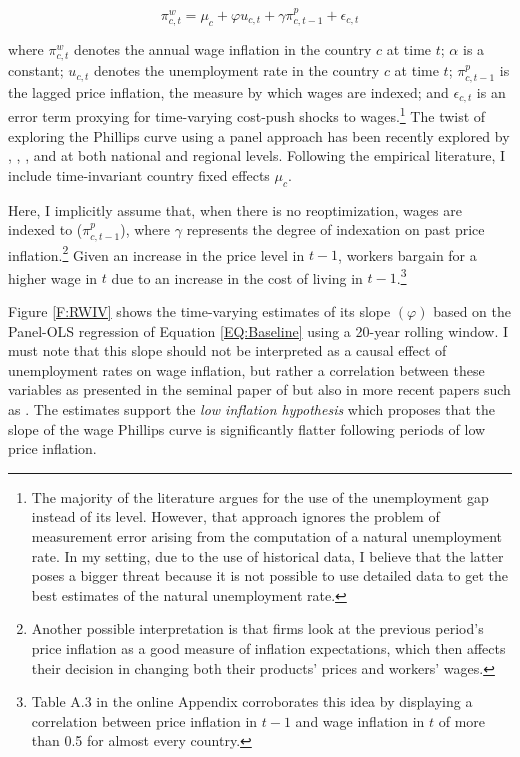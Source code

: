 \documentclass[12pt]{article}
\begin{document}
\begin{equation} \label{EQ:Baseline}
    \pi_{c,t}^w = \mu_c + \varphi u_{c,t} + \gamma \pi_{c,t-1}^p + \epsilon_{c,t}
\end{equation}

where $\pi_{c,t}^w$ denotes the annual wage inflation in the country $c$ at time $t$; $\alpha$ is a constant; $u_{c,t}$ denotes the unemployment rate in the country $c$ at time $t$; $\pi_{c,t-1}^p$ is the lagged price inflation, the measure by which wages are indexed; and $\epsilon_{c,t}$ is an error term proxying for time-varying cost-push shocks to wages.\footnote{The majority of the literature argues for the use of the unemployment gap instead of its level. However, that approach ignores the problem of measurement error arising from the computation of a natural unemployment rate. In my setting, due to the use of historical data, I believe that the latter poses a bigger threat because it is not possible to use detailed data to get the best estimates of the natural unemployment rate.} The twist of exploring the Phillips curve using a panel approach has been recently explored by \cite{Coibion2019}, \cite{Levy2019}, \cite{DeSchryder2020}, and \cite{Hazell2021} at both national and regional levels. Following the empirical literature, I include time-invariant country fixed effects $\mu_c$. %

Here, I implicitly assume that, when there is no reoptimization, wages are indexed to ($\pi_{c,t-1}^p$), where $\gamma$ represents the degree of indexation on past price inflation.\footnote{Another possible interpretation is that firms look at the previous period's price inflation as a good measure of inflation expectations, which then affects their decision in changing both their products' prices and workers' wages.} Given an increase in the price level in $t-1$, workers bargain for a higher wage in $t$ due to an increase in the cost of living in $t-1$.\footnote{Table A.3 in the online Appendix corroborates this idea by displaying a correlation between price inflation in $t-1$ and wage inflation in $t$ of more than 0.5 for almost every country.}

Figure \ref{F:RWIV} shows the time-varying estimates of its slope $(\varphi)$ based on the Panel-OLS regression of Equation \eqref{EQ:Baseline} using a 20-year rolling window. I must note that this slope should not be interpreted as a causal effect of unemployment rates on wage inflation, but rather a correlation between these variables as presented in the seminal paper of \cite{Phillips1958} but also in more recent papers such as \cite{Gali2011}. The estimates support the \textit{low inflation hypothesis} which proposes that the slope of the wage Phillips curve is significantly flatter following periods of low price inflation.
\end{document}
